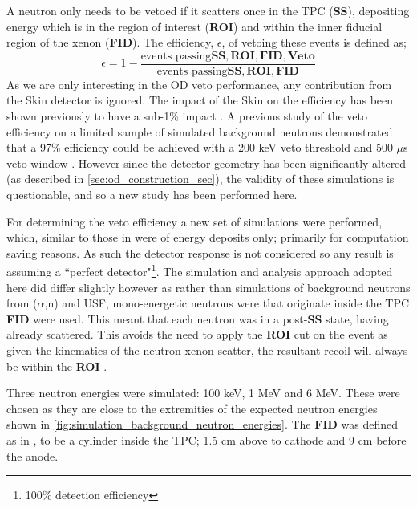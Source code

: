 \par
A neutron only needs to be vetoed if it scatters once in the TPC (\textbf{SS}), depositing energy which is in the region of interest (\textbf{ROI}) and within the inner fiducial region of the xenon (\textbf{FID}).
The efficiency, $\epsilon$, of vetoing these events is defined as;
\begin{equation}
    \epsilon = 1 - \frac{\text{events passing}\mathbf{SS, ROI, FID, Veto}}{\text{events passing}\mathbf{SS, ROI, FID}}
    \label{eq:neutron_efficiency}
\end{equation}
As we are only interesting in the OD veto performance, any contribution from the Skin detector is ignored.
The impact of the Skin on the efficiency has been shown previously to have a sub-1\% impact \cite{sallyshaw_thesis_ref}.
A previous study of the veto efficiency on a limited sample of simulated background neutrons demonstrated that a 97\% efficiency could be achieved with a 200 keV veto threshold and 500 $\mu$s veto window \cite{LZ_TechnicalDesignReview_ref}.
However since the detector geometry has been significantly altered (as described in \autoref{sec:od_construction_sec}), the validity of these simulations is questionable, and so a new study has been performed here.
\par
For determining the veto efficiency a new set of simulations were performed, which, similar to those in \cite{LZ_TechnicalDesignReview_ref} were of energy deposits only; primarily for computation saving reasons.
As such the detector response is not considered so any result is assuming a ``perfect detector"\footnote{100\% detection efficiency}.
The simulation and analysis approach adopted here did differ slightly however as rather than simulations of background neutrons from ($\alpha$,n) and USF, mono-energetic neutrons were that originate inside the TPC \textbf{FID} were used.
This meant that each neutron was in a post-\textbf{SS} state, having already scattered.
This avoids the need to apply the \textbf{ROI} cut on the event as given the kinematics of the neutron-xenon scatter, the resultant recoil will always be within the \textbf{ROI} \cite{xenon100_neutrons_ref}.
\par
Three neutron energies were simulated: 100 keV, 1 MeV and 6 MeV.
These were chosen as they are close to the extremities of the expected neutron energies shown in \autoref{fig:simulation_background_neutron_energies}.
The \textbf{FID} was defined as in \cite{LZ_TechnicalDesignReview_ref}, to be a cylinder inside the TPC; 1.5 cm above to cathode and 9 cm before the anode.
